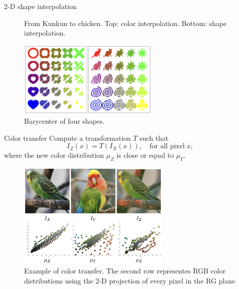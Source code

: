 \begin{frame}{2-D shape interpolation}
\begin{figure}
        \caption{From Kunkun to chicken. Top: color interpolation. Bottom: shape interpolation.}
    \end{figure}

    \vspace{-1.2em}
    \begin{figure}
        \centering
        \captionsetup{font=scriptsize}
        \includegraphics[width=0.6\textwidth]{png/2DShapeInterpolation.png}
        \caption{Barycenter of four shapes.}
    \end{figure}
\end{frame}

\begin{frame}{Color transfer}
    \footnotesize
    Compute a transformation $T$ such that 
    \begin{equation}
        I_Z(x) = T (I_X(x)),\quad \text{for all pixel}\;x,
    \end{equation}
    where the new color distribution $\mu_Z$ is close or equal to $\mu_Y$.
    \begin{figure}
        \centering
        \captionsetup{font=scriptsize}
        \includegraphics[width=0.65\textwidth]{png/color-transfer.png}
        \caption{Example of color transfer. 
        The second row representes RGB color distributions using the 2-D projection of every pixel in the RG plane}
    \end{figure}
\end{frame}

